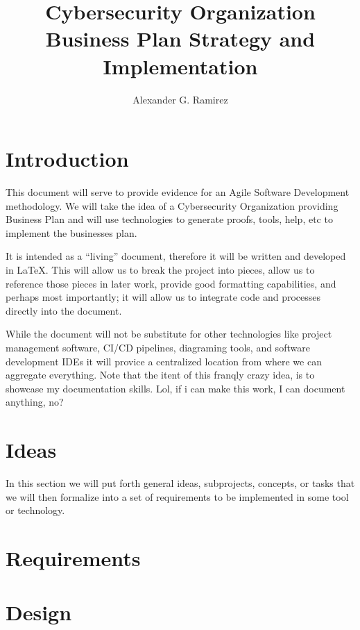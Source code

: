 \documentclass{article}
\title{%
    Cybersecurity Organization \\
    \large Business Plan Strategy and Implementation
}
\author{Alexander G. Ramirez}
\begin{document}
\maketitle
\tableofcontents

\section{Introduction}

This document will serve to provide evidence for an Agile Software Development
methodology.  We will take the idea of a Cybersecurity Organization providing
Business Plan and will use technologies to generate proofs, tools, help, etc to
implement the businesses plan.

It is intended as a ``living'' document, therefore it will be written and developed
in \LaTeX{}.  This will allow us to break the project into pieces, allow us to reference
those pieces in later work, provide good formatting capabilities, and perhaps
most importantly; it will allow us to integrate code and processes directly into 
the document.

While the document will not be substitute for other technologies like project 
management software, CI/CD pipelines, diagraming tools, and software development 
IDEs it will provice a centralized location from where we can aggregate everything.
Note that the itent of this franqly crazy idea, is to showcase my documentation
skills.  Lol, if i can make this work, I can document anything, no?




\section{Ideas}

In this section we will put forth general ideas, subprojects, concepts, or tasks
that we will then formalize into a set of requirements to be implemented in some 
tool or technology.



\section{Requirements}



\section{Design}
\end{document}
